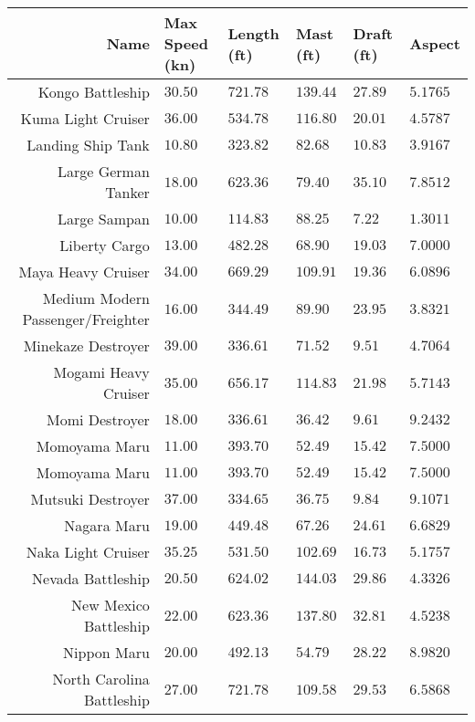 \documentclass{article}
\begin{document}
\pagebreak
\begin{tabularx}{\textwidth}{|r|l|l|X|X|X|}
\hline
Name & Max Speed (kn) & Length (ft) & Mast (ft) & Draft (ft) & Aspect\\
\hline
Kongo Battleship & $30.50$ & $721.78$ & $139.44$ & $27.89$ & $5.1765$ \\
\hline
Kuma Light Cruiser & $36.00$ & $534.78$ & $116.80$ & $20.01$ & $4.5787$ \\
\hline
Landing Ship Tank & $10.80$ & $323.82$ & $82.68$ & $10.83$ & $3.9167$ \\
\hline
Large German Tanker & $18.00$ & $623.36$ & $79.40$ & $35.10$ & $7.8512$ \\
\hline
Large Sampan & $10.00$ & $114.83$ & $88.25$ & $7.22$ & $1.3011$ \\
\hline
Liberty Cargo & $13.00$ & $482.28$ & $68.90$ & $19.03$ & $7.0000$ \\
\hline
Maya Heavy Cruiser & $34.00$ & $669.29$ & $109.91$ & $19.36$ & $6.0896$ \\
\hline
Medium Modern Passenger/Freighter & $16.00$ & $344.49$ & $89.90$ & $23.95$ & $3.8321$ \\
\hline
Minekaze Destroyer & $39.00$ & $336.61$ & $71.52$ & $9.51$ & $4.7064$ \\
\hline
Mogami Heavy Cruiser & $35.00$ & $656.17$ & $114.83$ & $21.98$ & $5.7143$ \\
\hline
Momi Destroyer & $18.00$ & $336.61$ & $36.42$ & $9.61$ & $9.2432$ \\
\hline
Momoyama Maru & $11.00$ & $393.70$ & $52.49$ & $15.42$ & $7.5000$ \\
\hline
Momoyama Maru & $11.00$ & $393.70$ & $52.49$ & $15.42$ & $7.5000$ \\
\hline
Mutsuki Destroyer & $37.00$ & $334.65$ & $36.75$ & $9.84$ & $9.1071$ \\
\hline
Nagara Maru & $19.00$ & $449.48$ & $67.26$ & $24.61$ & $6.6829$ \\
\hline
Naka Light Cruiser & $35.25$ & $531.50$ & $102.69$ & $16.73$ & $5.1757$ \\
\hline
Nevada Battleship & $20.50$ & $624.02$ & $144.03$ & $29.86$ & $4.3326$ \\
\hline
New Mexico Battleship & $22.00$ & $623.36$ & $137.80$ & $32.81$ & $4.5238$ \\
\hline
Nippon Maru & $20.00$ & $492.13$ & $54.79$ & $28.22$ & $8.9820$ \\
\hline
North Carolina Battleship & $27.00$ & $721.78$ & $109.58$ & $29.53$ & $6.5868$ \\
\hline
\end{tabularx}
\pagebreak
\end{document}
